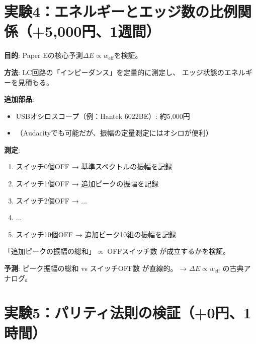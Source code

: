 \documentclass[12pt,a4paper]{article}
\begin{document}
\section{実験4：エネルギーとエッジ数の比例関係（+5,000円、1週間）}

\begin{nextbox}
\textbf{目的}: Paper Eの核心予測$\Delta E \propto w_{\mathrm{eff}}$を検証。

\textbf{方法}: LC回路の「インピーダンス」を定量的に測定し、
エッジ状態のエネルギーを見積もる。

\textbf{追加部品}:
\begin{itemize}
\item USBオシロスコープ（例：Hantek 6022BE）: 約5,000円
\item （Audacityでも可能だが、振幅の定量測定にはオシロが便利）
\end{itemize}

\textbf{測定}:
\begin{enumerate}
\item スイッチ0個OFF → 基準スペクトルの振幅を記録
\item スイッチ1個OFF → 追加ピークの振幅を記録
\item スイッチ2個OFF → ...
\item ...
\item スイッチ10個OFF → 追加ピーク10組の振幅を記録
\end{enumerate}

「追加ピークの振幅の総和」$\propto$ OFFスイッチ数
が成立するかを検証。

\textbf{予測}: ピーク振幅の総和 vs スイッチOFF数 が直線的。
→ $\Delta E \propto w_{\mathrm{eff}}$ の古典アナログ。
\end{nextbox}

\section{実験5：パリティ法則の検証（+0円、1時間）}
\end{document}
